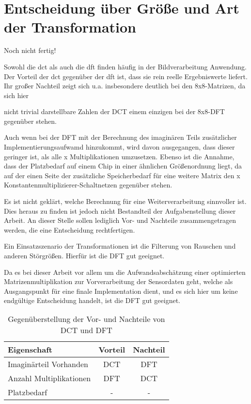  \section{Entscheidung über Größe und Art der Transformation}
 Noch nicht fertig!
 
 Sowohl die \gls{dct} als auch die \gls{dft} finden häufig in der Bildverarbeitung Anwendung. Der Vorteil der \gls{dct} gegenüber der \gls{dft} ist,
 dass sie rein reelle Ergebniswerte liefert. Ihr großer Nachteil zeigt sich u.a. insbesondere deutlich bei den 8x8-Matrizen, da sich hier 
 
 
 nicht trivial darstellbare Zahlen der DCT einem einzigen bei der 8x8-DFT gegenüber stehen.
 

Auch wenn bei der DFT mit der Berechnung des imaginären Teils zusätzlicher Implementierungsaufwamd hinzukommt, wird davon ausgegangen, dass dieser geringer ist, 
 als alle x Multiplikationen umzusetzen. Ebenso ist die Annahme, dass der Platzbedarf auf einem Chip in einer ähnlichen Größenordnung liegt, da auf der einen Seite
 der zusätzliche Speicherbedarf für eine weitere Matrix den x Konstantenmultiplizierer-Schaltnetzen gegenüber stehen.
 
 Es ist nicht geklärt, welche Berechnung für eine Weiterverarbeitung sinnvoller ist. Dies heraus zu finden ist jedoch nicht Bestandteil der Aufgabenstellung dieser Arbeit.
 An dieser Stelle sollen lediglich Vor- und Nachteile zusammengetragen werden, die eine Entscheidung rechtfertigen.
 
 Ein Einsatzszenario der Transformationen ist die Filterung von Rauschen und anderen Störgrößen. Hierfür ist die DFT gut geeignet. 
 
 
 Da es bei dieser Arbeit vor allem um die Aufwandsabschätzung einer optimierten Matrizenmultiplikation zur Vorverarbeitung der Sensordaten geht, 
 welche als Ausgangspunkt für eine finale Implementation dient, und es sich hier um keine endgültige Entscheidung handelt, ist die DFT gut geeignet.
 
 
 \begin{table}[ht]
 \centering
  \caption{Gegenüberstellung der Vor- und Nachteile von DCT und DFT}
  \begin{tabular}{lcc}
  \hline
      Eigenschaft          & Vorteil   & Nachteil\\
  \hline
   Imaginärteil Vorhanden  & DCT       & DFT \\
   Anzahl Multiplikationen & DFT       & DCT\\
   Platzbedarf             &  -        &  - \\
   \hline
  \end{tabular}
  \label{tab:gegenüberstellung_dct_dft}
 \end{table}
